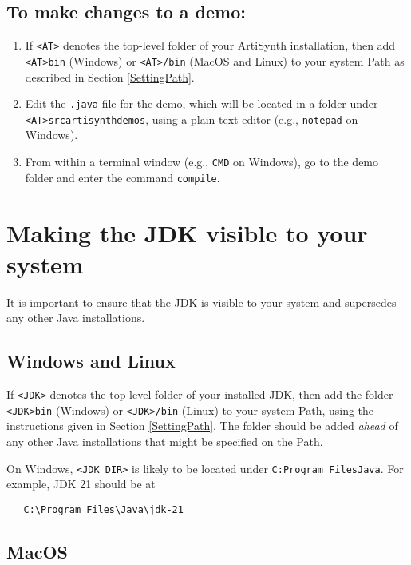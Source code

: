\documentclass{article}
\begin{document}
\subsection{To make changes to a demo:}

\begin{enumerate}

\item If {\tt <AT>} denotes the top-level folder of your ArtiSynth
installation, then add {\tt <AT>\BKS bin} (Windows) or {\tt <AT>/bin}
(MacOS and Linux) to your system Path
as described in Section \ref{SettingPath}.

\item Edit the {\tt .java} file for the demo, which will be located
in a folder under {\tt <AT>\BKS src\BKS artisynth\BKS demos},
using a plain text editor (e.g., {\tt notepad} on Windows).

\item From within a terminal window (e.g., {\tt CMD} on Windows), go to the
demo folder and enter the command {\tt compile}.

\end{enumerate}

\section{Making the JDK visible to your system}
\label{MakingJDKVisible}

It is important to ensure that the JDK is visible to your system and
supersedes any other Java installations.

\subsection{Windows and Linux}

If {\tt <JDK>} denotes the top-level folder of your installed JDK,
then add the folder {\tt <JDK>\BKS bin} (Windows) or {\tt <JDK>/bin}
(Linux) to your system Path, using the instructions given in Section
\ref{SettingPath}. The folder should be added {\it ahead} of any other
Java installations that might be specified on the Path.

On Windows, {\tt <JDK\_DIR>} is likely to be located under {\tt C:\BKS Program
Files\BKS Java}. For example, JDK 21 should be at
\begin{verbatim}
   C:\Program Files\Java\jdk-21
\end{verbatim}

\subsection{MacOS}
\end{document}
